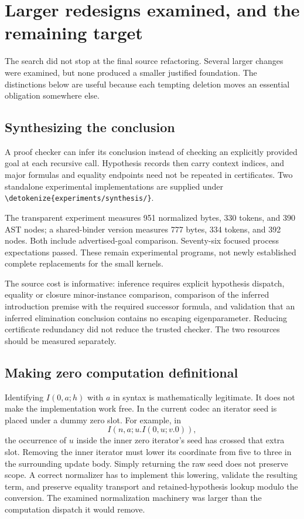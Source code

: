 \documentclass[11pt,letterpaper]{article}
\theoremstyle{definition}\newtheorem{definition}[theorem]{Definition}
\theoremstyle{remark}\newtheorem{remark}[theorem]{Remark}
\newcommand{\file}[1]{\expandafter\nolinkurl\expandafter{\detokenize{#1}}}
\begin{document}
\section{Larger redesigns examined, and the remaining target}

The search did not stop at the final source refactoring. Several larger
changes were examined, but none produced a smaller justified foundation.
The distinctions below are useful because each tempting deletion moves
an essential obligation somewhere else.

\subsection{Synthesizing the conclusion}

A proof checker can infer its conclusion instead of checking an explicitly
provided goal at each recursive call. Hypothesis records then carry
context indices, and major formulas and equality endpoints need not be
repeated in certificates. Two standalone experimental implementations
are supplied under \file{experiments/synthesis/}.

The transparent experiment measures 951 normalized bytes, 330 tokens,
and 390 AST nodes; a shared-binder version measures 777 bytes, 334 tokens,
and 392 nodes. Both include advertised-goal comparison. Seventy-six
focused process expectations passed. These remain experimental programs,
not newly established complete replacements for the small kernels.

The source cost is informative: inference requires explicit hypothesis
dispatch, equality or closure minor-instance comparison, comparison of
the inferred introduction premise with the required successor formula,
and validation that an inferred elimination conclusion contains no
escaping eigenparameter. Reducing certificate redundancy did not reduce
the trusted checker. The two resources should be measured separately.

\subsection{Making zero computation definitional}

Identifying $I(0,a;h)$ with $a$ in syntax is mathematically legitimate.
It does not make the implementation work free. In the current codec an
iterator seed is placed under a dummy zero slot. For example, in
\[
 I(n,a;u.I(0,u;v.0)),
\]
the occurrence of $u$ inside the inner zero iterator's seed has crossed
that extra slot. Removing the inner iterator must lower its coordinate
from five to three in the surrounding update body. Simply returning the
raw seed does not preserve scope. A correct normalizer has to implement
this lowering, validate the resulting term, and preserve equality
transport and retained-hypothesis lookup modulo the conversion.
The examined normalization machinery was larger than the computation
dispatch it would remove.
\end{document}
